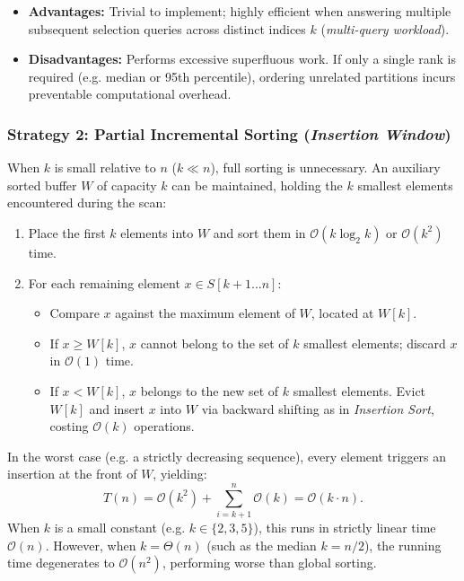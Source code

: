 \begin{itemize}
  \item \textbf{Advantages:} Trivial to implement; highly efficient when answering multiple subsequent selection queries across distinct indices $k$ (\textit{multi-query workload}).
  \item \textbf{Disadvantages:} Performs excessive superfluous work. If only a single rank is required (e.g. median or 95th percentile), ordering unrelated partitions incurs preventable computational overhead.
\end{itemize}

\subsubsection{Strategy 2: Partial Incremental Sorting (\textit{Insertion Window})}
When $k$ is small relative to $n$ ($k \ll n$), full sorting is unnecessary. An auxiliary sorted buffer $W$ of capacity $k$ can be maintained, holding the $k$ smallest elements encountered during the scan:

\begin{enumerate}
  \item Place the first $k$ elements into $W$ and sort them in $\mathcal{O}(k \log_2 k)$ or $\mathcal{O}(k^2)$ time.
  \item For each remaining element $x \in S[k+1 \dots n]$:
  \begin{itemize}
    \item Compare $x$ against the maximum element of $W$, located at $W[k]$.
    \item If $x \ge W[k]$, $x$ cannot belong to the set of $k$ smallest elements; discard $x$ in $\mathcal{O}(1)$ time.
    \item If $x < W[k]$, $x$ belongs to the new set of $k$ smallest elements. Evict $W[k]$ and insert $x$ into $W$ via backward shifting as in \textit{Insertion Sort}, costing $\mathcal{O}(k)$ operations.
  \end{itemize}
\end{enumerate}

In the worst case (e.g. a strictly decreasing sequence), every element triggers an insertion at the front of $W$, yielding:
\begin{equation}
  T(n) = \mathcal{O}(k^2) + \sum_{i=k+1}^n \mathcal{O}(k) = \mathcal{O}(k \cdot n).
\end{equation}
When $k$ is a small constant (e.g. $k \in \{2, 3, 5\}$), this runs in strictly linear time $\mathcal{O}(n)$. However, when $k = \Theta(n)$ (such as the median $k = n/2$), the running time degenerates to $\mathcal{O}(n^2)$, performing worse than global sorting.

